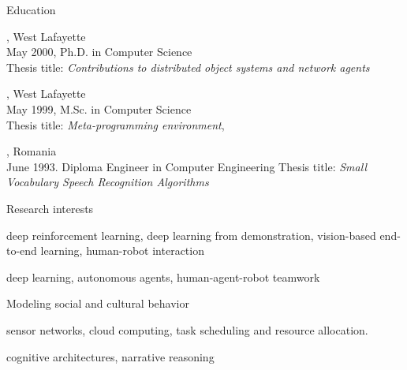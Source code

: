 \documentclass[10pt]{resume}
\author{Ladislau B{\"o}l{\"o}ni}
\begin{document}
\maketitle


\begin{category}{Education}

, West Lafayette \\
May 2000, Ph.D. in Computer Science \\
Thesis title: {\em Contributions to distributed object systems and network
agents}

, West Lafayette \\
May 1999, M.Sc. in Computer Science \\
Thesis title: {\em Meta-programming environment},

, Romania\\
June 1993. Diploma Engineer in Computer Engineering
Thesis title: {\em Small Vocabulary Speech Recognition Algorithms}

\end{category}



\begin{category}{Research interests}

 deep reinforcement learning, deep learning from demonstration, vision-based end-to-end learning, human-robot interaction

 deep learning, autonomous agents, human-agent-robot teamwork

 Modeling social and cultural behavior

 sensor networks, cloud computing, task scheduling and resource allocation.

 cognitive architectures, narrative reasoning

\end{category}
\end{document}
